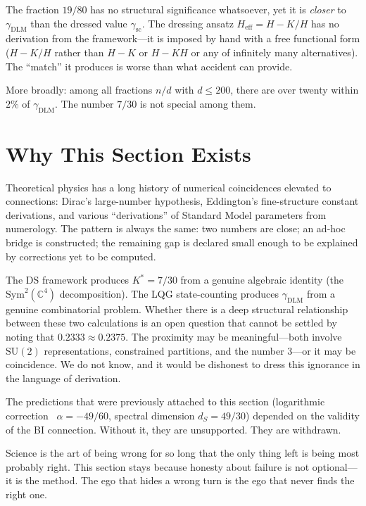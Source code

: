 \documentclass[11pt,a4paper]{article}
\theoremstyle{definition}
\theoremstyle{remark}
\newcommand{\C}{\mathbb{C}}
\newcommand{\SU}{\mathrm{SU}}
\begin{document}
The fraction $19/80$ has no structural significance whatsoever, yet it is \emph{closer} to $\gamma_{\mathrm{DLM}}$ than the dressed value $\gamma_{\mathrm{sc}}$. The dressing ansatz $H_{\mathrm{eff}}=H-K/H$ has no derivation from the framework---it is imposed by hand with a free functional form ($H-K/H$ rather than $H-K$ or $H-KH$ or any of infinitely many alternatives). The ``match'' it produces is worse than what accident can provide.

More broadly: among all fractions $n/d$ with $d\leq 200$, there are over twenty within $2\%$ of $\gamma_{\mathrm{DLM}}$. The number $7/30$ is not special among them.


\section{Why This Section Exists}\label{sec:whynumerology}

Theoretical physics has a long history of numerical coincidences elevated to connections: Dirac's large-number hypothesis, Eddington's fine-structure constant derivations, and various ``derivations'' of Standard Model parameters from numerology. The pattern is always the same: two numbers are close; an ad-hoc bridge is constructed; the remaining gap is declared small enough to be explained by corrections yet to be computed.

The DS framework produces $K^*=7/30$ from a genuine algebraic identity (the $\mathrm{Sym}^2(\C^4)$ decomposition). The LQG state-counting produces $\gamma_{\mathrm{DLM}}$ from a genuine combinatorial problem. Whether there is a deep structural relationship between these two calculations is an open question that cannot be settled by noting that $0.2333\approx 0.2375$. The proximity may be meaningful---both involve $\SU(2)$ representations, constrained partitions, and the number $3$---or it may be coincidence. We do not know, and it would be dishonest to dress this ignorance in the language of derivation.

The predictions that were previously attached to this section (logarithmic correction~\cite{KM2000} $\alpha=-49/60$, spectral dimension $d_S=49/30$) depended on the validity of the BI connection. Without it, they are unsupported. They are withdrawn.

Science is the art of being wrong for so long that the only thing left is being most probably right. This section stays because honesty about failure is not optional---it is the method. The ego that hides a wrong turn is the ego that never finds the right one.
\end{document}

